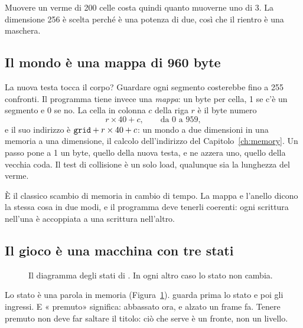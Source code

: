 Muovere un verme di 200 celle costa quindi quanto muoverne uno di 3. La
dimensione 256 è scelta perché è una potenza di due, così che il rientro è una
maschera.

\subsection{Il mondo è una mappa di 960 byte}

La nuova testa tocca il corpo? Guardare ogni segmento costerebbe fino a 255
confronti. Il programma tiene invece una \emph{mappa}: un byte per cella, 1 se
c'è un segmento e 0 se no. La cella in colonna $c$ della riga $r$ è il byte
numero
\[ r\times 40+c,\qquad\text{da 0 a 959}, \]
e il suo indirizzo è $\texttt{grid}+r\times 40+c$: un mondo a due dimensioni in
una memoria a una dimensione, il calcolo dell'indirizzo del
Capitolo~\ref{ch:memory}. Un passo pone a 1 un byte, quello della nuova testa,
e ne azzera uno, quello della vecchia coda. Il test di collisione è un solo
load, qualunque sia la lunghezza del verme.

È il classico scambio di memoria in cambio di tempo. La mappa e l'anello dicono
la stessa cosa in due modi, e il programma deve tenerli coerenti: ogni
scrittura nell'una è accoppiata a una scrittura nell'altro.

\subsection{Il gioco è una macchina con tre stati}

\begin{figure}[htb]
\centering
{}
\caption{Il diagramma degli stati di \vermone. In ogni altro caso lo stato non cambia.}
\label{fig:v3:fsm}
\end{figure}

Lo stato è una parola in memoria (Figura~\ref{fig:v3:fsm}). 
guarda prima lo stato e poi gli ingressi. E « premuto» significa:
abbassato ora, e alzato un frame fa. Tenere premuto  non deve far
saltare il titolo: ciò che serve è un fronte, non un livello.

